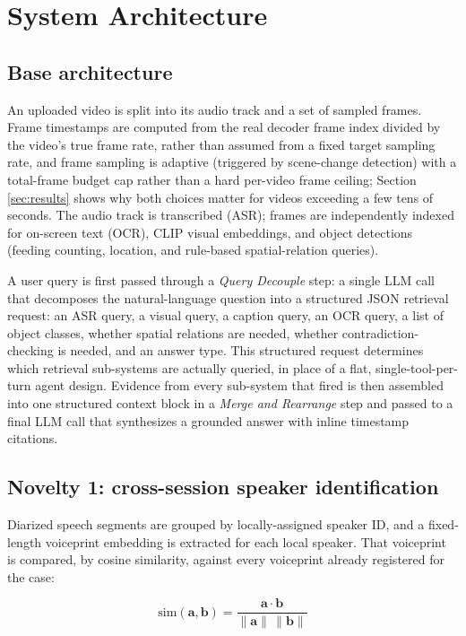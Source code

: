 \documentclass[3p,times,procedia]{elsarticle}
\begin{document}
\section{System Architecture}
\label{sec:arch}

\subsection{Base architecture}

An uploaded video is split into its audio track and a set of sampled frames.
Frame timestamps are computed from the real decoder frame index divided by the video's
true frame rate, rather than assumed from a fixed target sampling rate, and frame
sampling is adaptive (triggered by scene-change detection) with a total-frame budget
cap rather than a hard per-video frame ceiling; Section \ref{sec:results} shows why
both choices matter for videos exceeding a few tens of seconds. The audio track is
transcribed (ASR); frames are independently indexed for on-screen text (OCR), CLIP
visual embeddings, and object detections (feeding counting, location, and rule-based
spatial-relation queries).

A user query is first passed through a \emph{Query Decouple} step: a single LLM call
that decomposes the natural-language question into a structured JSON retrieval request:
an ASR query, a visual query, a caption query, an OCR query, a list of object
classes, whether spatial relations are needed, whether contradiction-checking is
needed, and an answer type. This structured request determines which retrieval
sub-systems are actually queried, in place of a flat, single-tool-per-turn agent
design. Evidence from every sub-system that fired is then assembled into one
structured context block in a \emph{Merge and Rearrange} step and passed to a final
LLM call that synthesizes a grounded answer with inline timestamp citations.

\subsection{Novelty 1: cross-session speaker identification}
\label{sec:novelty1}

Diarized speech segments are grouped by locally-assigned speaker ID, and a fixed-length
voiceprint embedding is extracted for each local speaker. That voiceprint is compared,
by cosine similarity, against every voiceprint already registered for the case:

\begin{equation}
\text{sim}(\mathbf{a}, \mathbf{b}) = \frac{\mathbf{a} \cdot \mathbf{b}}{\lVert\mathbf{a}\rVert \, \lVert\mathbf{b}\rVert}
\label{eq:cosine}
\end{equation}
\end{document}
